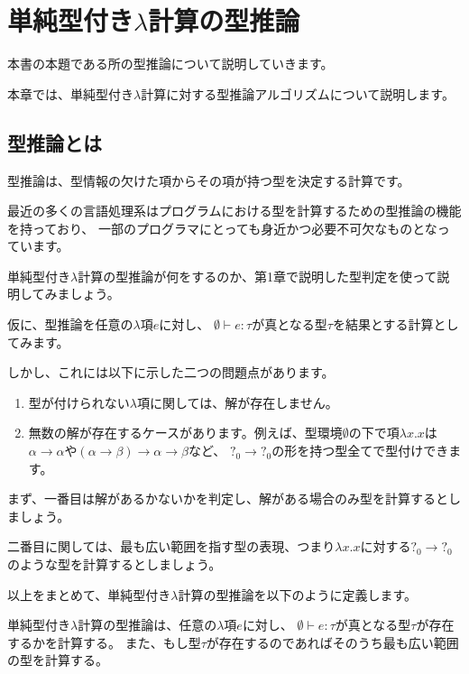 
\chapter{単純型付き$\lambda$計算の型推論}

本書の本題である所の型推論について説明していきます。

本章では、単純型付き$\lambda$計算に対する型推論アルゴリズムについて説明します。

\section{型推論とは}

型推論は、型情報の欠けた項からその項が持つ型を決定する計算です。

最近の多くの言語処理系はプログラムにおける型を計算するための型推論の機能を持っており、
一部のプログラマにとっても身近かつ必要不可欠なものとなっています。

単純型付き$\lambda$計算の型推論が何をするのか、第1章で説明した型判定を使って説明してみましょう。

仮に、型推論を任意の$\lambda$項$e$に対し、
$\emptyset \vdash e : \tau$が真となる型$\tau$を結果とする計算としてみます。

しかし、これには以下に示した二つの問題点があります。

\begin{enumerate}
  \item 型が付けられない$\lambda$項に関しては、解が存在しません。
  \item 無数の解が存在するケースがあります。例えば、型環境$\emptyset$の下で項$\lambda x . x$は
       $\alpha \to \alpha$や$(\alpha \to \beta) \to \alpha \to \beta$など、
       $?_0 \to ?_0$の形を持つ型全てで型付けできます。
\end{enumerate}

まず、一番目は解があるかないかを判定し、解がある場合のみ型を計算するとしましょう。

二番目に関しては、最も広い範囲を指す型の表現、つまり$\lambda x . x$に対する$?_0 \to ?_0$
のような型を計算するとしましょう。

以上をまとめて、単純型付き$\lambda$計算の型推論を以下のように定義します。

\begin{definition}
単純型付き$\lambda$計算の型推論は、任意の$\lambda$項$e$に対し、
$\emptyset \vdash e : \tau$が真となる型$\tau$が存在するかを計算する。
また、もし型$\tau$が存在するのであればそのうち最も広い範囲の型を計算する。
\end{definition}

